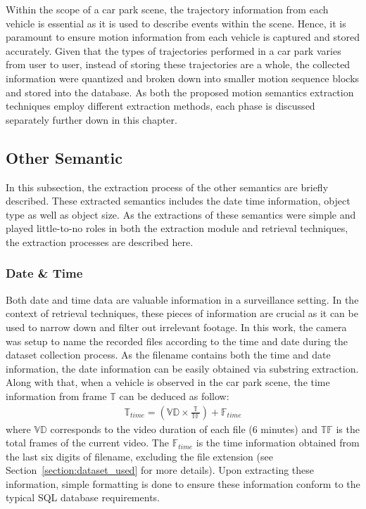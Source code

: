 Within the scope of a car park scene, the trajectory information from each vehicle is essential as it is used to describe events within the scene.
Hence, it is paramount to ensure motion information from each vehicle is captured and stored accurately.
Given that the types of trajectories performed in a car park varies from user to user, instead of storing these trajectories are a whole, the collected information were quantized and broken down into smaller motion sequence blocks and stored into the database.
As both the proposed motion semantics extraction techniques employ different extraction methods, each phase is discussed separately further down in this chapter.

\subsection{Other Semantic}

In this subsection, the extraction process of the other semantics are briefly described. These extracted semantics includes the date time information, object type as well as object size. As the extractions of these semantics were simple and played little-to-no roles in both the extraction module and retrieval techniques, the extraction processes are described here.

\subsubsection{Date \& Time}

Both date and time data are valuable information in a surveillance setting. In the context of retrieval techniques, these pieces of information are crucial as it can be used to narrow down and filter out irrelevant footage. In this work, the camera was setup to name the recorded files according to the time and date during the dataset collection process. As the filename contains both the time and date information, the date information can be easily obtained via substring extraction. Along with that, when a vehicle is observed in the car park scene, the time information from frame $\mathbb{T}$ can be deduced as follow:
\begin{align}
    \mathbb{T}_{time}  = (\mathbb{VD} \times \frac{\mathbb{T}}{\mathbb{TF}}) + \mathbb{F}_{time}
\end{align}
where $\mathbb{VD}$ corresponds to the video duration of each file (6 minutes) and $\mathbb{TF}$ is the total frames of the current video. The $\mathbb{F}_{time}$ is the time information obtained from the last six digits of filename, excluding the file extension (see Section~\ref{section:dataset_used} for more details). Upon extracting these information, simple formatting is done to ensure these information conform to the typical SQL database requirements.


